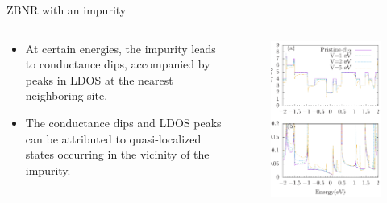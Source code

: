 \documentclass[handout,t]{beamer}
\begin{document}
\begin{frame}{ZBNR with an impurity}
	\begin{columns}[t]
		\begin{column}[t]{0.4\linewidth}
			\begin{itemize}
				\item At certain energies, the impurity leads to conductance dips, accompanied by peaks in LDOS at the nearest neighboring site.
				\item The conductance dips and LDOS peaks can be attributed to quasi-localized states occurring in the vicinity of the impurity.
			\end{itemize}
		\end{column}
		\begin{column}[t]{0.6\linewidth}
			\begin{figure}[!ht]
				\raggedleft
				\includegraphics[width=.8\linewidth]{../figures/zigscatter-thesis.eps}
				\label{zigscatter}
			\end{figure}
		\end{column}
	\end{columns}
\end{frame}
\end{document}
